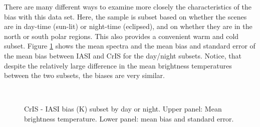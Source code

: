 \documentclass[11pt]{article}
\begin{document}
There are many different ways to examine more closely the characteristics of the bias with this data set. Here, the sample is subset based on whether the scenes are in day-time (sun-lit) or night-time (eclipsed), and on whether they are in the north or south polar regions. This also provides a convenient warm and cold subset. Figure \ref{fig:X5} shows the mean spectra and the mean bias and standard error of the mean bias between IASI and CrIS for the day/night subsets. Notice, that despite the
relatively large difference in the mean brightness temperatures between the two subsets, the biases are very similar.




\begin{figure}[htb]
    \centering
    \,
    \caption{CrIS - IASI bias (K) subset by day or night. Upper panel: Mean brightness temperature. Lower panel: mean bias and standard error.}%
    \label{fig:X5}%
\end{figure}
\end{document}
